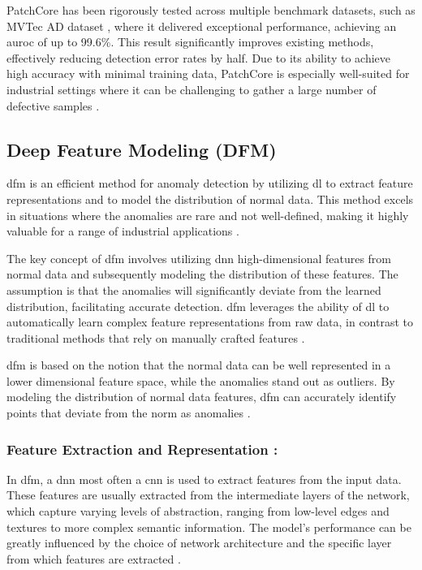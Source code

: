 PatchCore has been rigorously tested across multiple benchmark datasets, such as MVTec AD dataset \cite{8954181}, where it delivered exceptional performance, achieving an \gls{auroc} of up to 99.6\%. This result significantly improves existing methods, effectively reducing detection error rates by half. Due to its ability to achieve high accuracy with minimal training data, PatchCore is especially well-suited for industrial settings where it can be challenging to gather a large number of defective samples \cite{roth2022totalrecallindustrialanomaly}.

\subsection{Deep Feature Modeling (DFM)}
\label{subsec:dfm}

\gls{dfm} is an efficient method for anomaly detection by utilizing \gls{dl} to extract feature representations and to model the distribution of normal data. This method excels in situations where the anomalies are rare and not well-defined, making it highly valuable for a range of industrial applications \cite{ahuja2019probabilisticmodelingdeepfeatures}.

The key concept of \gls{dfm} involves utilizing \gls{dnn} high-dimensional features from normal data and subsequently modeling the distribution of these features. The assumption is that the anomalies will significantly deviate from the learned distribution, facilitating accurate detection. \gls{dfm} leverages the ability of \gls{dl} to automatically learn complex feature representations from raw data, in contrast to traditional methods that rely on manually crafted features \cite{ahuja2019probabilisticmodelingdeepfeatures}.

\gls{dfm} is based on the notion that the normal data can be well represented in a lower dimensional feature space, while the anomalies stand out as outliers. By modeling the distribution of normal data features, \gls{dfm} can accurately identify points that deviate from the norm as anomalies \cite{ahuja2019probabilisticmodelingdeepfeatures}.

\subsubsection*{Feature Extraction and Representation :}

In \gls{dfm}, a \gls{dnn} most often a \gls{cnn} is used to extract features from the input data. These features are usually extracted from the intermediate layers of the network, which capture varying levels of abstraction, ranging from low-level edges and textures to more complex semantic information. The model's performance can be greatly influenced by the choice of network architecture and the specific layer from which features are extracted \cite{8954181}.

